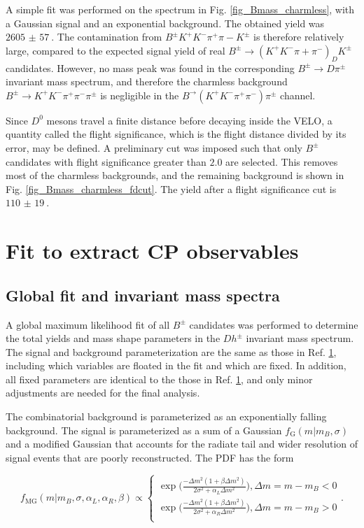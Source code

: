 \documentclass[12pt, a4paper, notitlepage, onecolumn]{article}
\numberwithin{equation}{section}
\begin{document}
A simple fit was performed on the spectrum in Fig. \ref{fig_Bmass_charmless}, with a Gaussian signal and an exponential background. The obtained yield was $\SI{2605(57)}{}$. The contamination from $B^\pm K^+K^-\pi^+\pi-K^\pm$ is therefore relatively large, compared to the expected signal yield of real $B^\pm\to (K^+K^-\pi+\pi^-)_DK^\pm$ candidates. However, no mass peak was found in the corresponding $B^\pm\to D\pi^\pm$ invariant mass spectrum, and therefore the charmless background $B^\pm\to K^+K^-\pi^+\pi^-\pi^\pm$ is negligible in the $B^\to (K^+K^-\pi^+\pi^-)\pi^\pm$ channel.

Since $D^0$ mesons travel a finite distance before decaying inside the VELO, a quantity called the flight significance, which is the flight distance divided by its error, may be defined. A preliminary cut was imposed such that only $B^\pm$ candidates with flight significance greater than $2.0$ are selected. This removes most of the charmless backgrounds, and the remaining background is shown in Fig. \ref{fig_Bmass_charmless_fdcut}. The yield after a flight significance cut is $\SI{110(19)}{}$.
\section{Fit to extract CP observables}
\subsection{Global fit and invariant mass spectra}
\label{section_global_fit}
\noindent A global maximum likelihood fit of all $B^\pm$ candidates was performed to determine the total yields and mass shape parameters in the $Dh^\pm$ invariant mass spectrum. The signal and background parameterization are the same as those in Ref. \ref{}, including which variables are floated in the fit and which are fixed. In addition, all fixed parameters are identical to the those in Ref. \ref{}, and only minor adjustments are needed for the final analysis.

The combinatorial background is parameterized as an exponentially falling background. The signal is parameterized as a sum of a Gaussian $f_\text{G}(m|m_B, \sigma)$ and a modified Gaussian that accounts for the radiate tail and wider resolution of signal events that are poorly reconstructed. The PDF has the form

\begin{equation}
  f_\text{MG}(m|m_B, \sigma, \alpha_L, \alpha_R, \beta)\propto
  \begin{cases}
    \exp\Big(\frac{-\Delta m^2(1 + \beta\Delta m^2)}{2\sigma^2 + \alpha_L\Delta m^2}\Big), \Delta m = m - m_B < 0 \\
    \exp\Big(\frac{-\Delta m^2(1 + \beta\Delta m^2)}{2\sigma^2 + \alpha_R\Delta m^2}\Big), \Delta m = m - m_B > 0 \\
  \end{cases}.
\end{equation}
\end{document}
